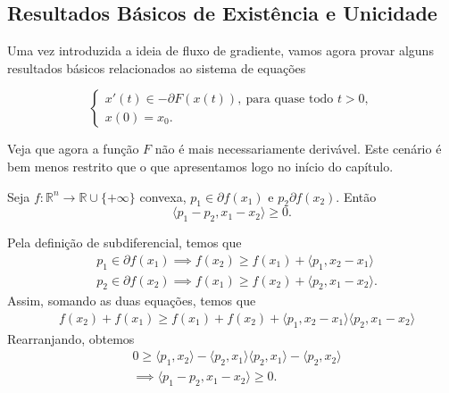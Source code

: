 \subsection{Resultados Básicos de Existência e Unicidade}

Uma vez introduzida a ideia de fluxo de gradiente, vamos agora provar alguns
resultados básicos relacionados ao sistema de equações

\begin{equation}
    \begin{cases}
        x'(t) \in -\partial F(x(t)), \ \text{para quase todo } t>0,\\
        x(0)  = x_0.
    \end{cases}
    \label{eq:fluxograd}
\end{equation}

Veja que agora a função $F$ não é mais necessariamente derivável. Este cenário
é bem menos restrito que o que apresentamos logo no início do capítulo.

\begin{lemma}
    Seja $f:\mathbb R^n \to \mathbb R \cup \{+\infty\}$ convexa, $p_1 \in \partial f(x_1)$
    e $p_2 \partial f(x_2)$. Então
    \begin{equation}
        \langle p_1 - p_2, x_1 - x_2 \rangle \geq 0.
    \end{equation}
\end{lemma}
\begin{prf}
    Pela definição de subdiferencial, temos que
    \begin{align*}
        &p_1 \in \partial f(x_1) \implies f(x_2) \geq f(x_1) + \langle p_1, x_2 - x_1\rangle\\
        &p_2 \in \partial f(x_2) \implies
        f(x_1) \geq f(x_2) + \langle p_2, x_1 - x_2\rangle.
    \end{align*}
    Assim, somando as duas equações, temos que
    \begin{align*}
        &f(x_2) + f(x_1) \geq f(x_1) + f(x_2) +
        \langle p_1, x_2 - x_1\rangle
        \langle p_2, x_1 - x_2\rangle
    \end{align*}
    Rearranjando, obtemos
    \begin{align*}
        &0 \geq
        \langle p_1,x_2 \rangle
        -\langle p_2,x_1 \rangle
        \langle p_2,x_1 \rangle
        -\langle p_2,x_2 \rangle \\
        &\implies
        \langle p_1 - p_2 , x_1 - x_2 \rangle \geq 0.
    \end{align*}
\end{prf}

